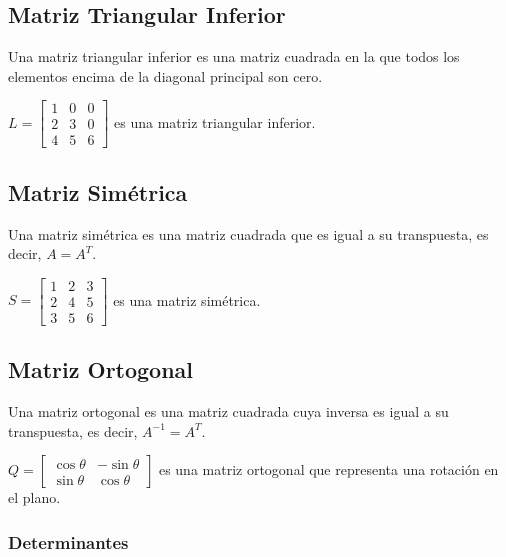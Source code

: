 \subsection{Matriz Triangular Inferior}

Una matriz triangular inferior es una matriz cuadrada en la que todos los elementos encima de la diagonal principal son cero.

\begin{example}
	$L = \begin{bmatrix} 1 & 0 & 0 \\ 2 & 3 & 0 \\ 4 & 5 & 6 \end{bmatrix}$ es una matriz triangular inferior.
\end{example}

\subsection{Matriz Simétrica}

Una matriz simétrica es una matriz cuadrada que es igual a su transpuesta, es decir, $A = A^T$.

\begin{example}
	$S = \begin{bmatrix} 1 & 2 & 3 \\ 2 & 4 & 5 \\ 3 & 5 & 6 \end{bmatrix}$ es una matriz simétrica.
\end{example}

\subsection{Matriz Ortogonal}

Una matriz ortogonal es una matriz cuadrada cuya inversa es igual a su transpuesta, es decir, $A^{-1} = A^T$.

\begin{example}
	$Q = \begin{bmatrix} \cos \theta & -\sin \theta \\ \sin \theta & \cos \theta \end{bmatrix}$ es una matriz ortogonal que representa una rotación en el plano.
\end{example}

\subsubsection{Determinantes}

